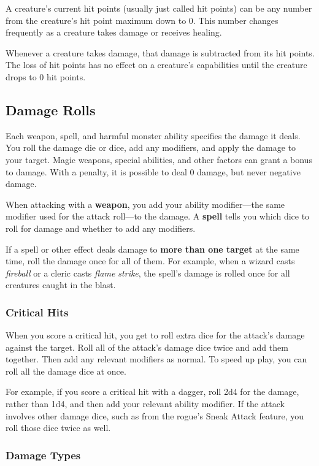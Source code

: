 A creature's current hit points (usually just called hit points) can be any number from the creature's hit point maximum down to 0. This number changes frequently as a creature takes damage or receives healing.

Whenever a creature takes damage, that damage is subtracted from its hit points. The loss of hit points has no effect on a creature's capabilities until the creature drops to 0 hit points.

\subsection{Damage Rolls}

Each weapon, spell, and harmful monster ability specifies the damage it deals. You roll the damage die or dice, add any modifiers, and apply the damage to your target. Magic weapons, special abilities, and other factors can grant a bonus to damage. With a penalty, it is possible to deal 0 damage, but never negative damage.

When attacking with a \textbf{weapon}, you add your ability modifier—the same modifier used for the attack roll—to the damage. A \textbf{spell} tells you which dice to roll for damage and whether to add any modifiers.

If a spell or other effect deals damage to \textbf{more than one target} at the same time, roll the damage once for all of them. For example, when a wizard casts \textit{fireball} or a cleric casts \textit{flame strike}, the spell's damage is rolled once for all creatures caught in the blast.

\subsubsection{Critical Hits}

When you score a critical hit, you get to roll extra dice for the attack's damage against the target. Roll all of the attack's damage dice twice and add them together. Then add any relevant modifiers as normal. To speed up play, you can roll all the damage dice at once.

For example, if you score a critical hit with a dagger, roll 2d4 for the damage, rather than 1d4, and then add your relevant ability modifier. If the attack involves other damage dice, such as from the rogue's Sneak Attack feature, you roll those dice twice as well.

\subsubsection{Damage Types}

